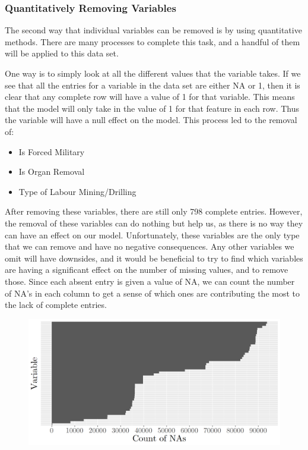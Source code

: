 \documentclass{article} %
\begin{document}
	
	\subsubsection{Quantitatively Removing Variables}
	
	The second way that individual variables can be removed is by using quantitative methods. There are many processes to complete this task, and a handful of them will be applied to this data set. 
	
	One way is to simply look at all the different values that the variable takes. If we see that all the entries for a variable in the data set are either NA or 1, then it is clear that any complete row will have a value of 1 for that variable. This means that the model will only take in the value of 1 for that feature in each row. Thus the variable will have a null effect on the model. This process led to the removal of:
	

	\begin{multicols}{2}
		\begin{itemize}
			\item Is Forced Military
			\item Is Organ Removal
			\item Type of Labour Mining/Drilling
		\end{itemize}
	\end{multicols}
	
	After removing these variables, there are still only 798 complete entries. However, the removal of these variables can do nothing but help us, as there is no way they can have an effect on our model. Unfortunately, these variables are the only type that we can remove and have no negative consequences. Any other variables we omit will have downsides, and it would be beneficial to try to find which variables are having a significant effect on the number of missing values, and to remove those. Since each absent entry is given a value of NA, we can count the number of NA's in each column to get a sense of which ones are contributing the most to the lack of complete entries.
	
	\begin{figure}[H]
		\includegraphics[width = \textwidth]{NABarplot}
	\end{figure}
	
\end{document}
